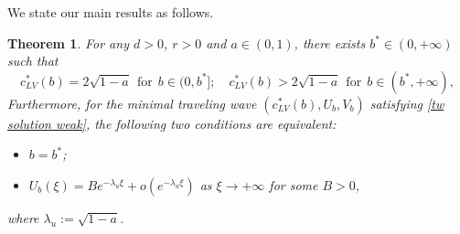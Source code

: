 \documentclass[11pt,a4paper]{article}
\newtheorem{theorem}{\textbf{Theorem}}[section]
\numberwithin{equation}{section}
\numberwithin{figure}{section}
\newcommand{\red}[1]{{\color{red}#1}}
\begin{document}


We state our main results as follows.

\begin{theorem}\label{th:threshold}
For any $d>0$, $r>0$ and $a\in(0,1)$, there exists $b^*\in(0,+\infty)$
such that
\begin{equation*}
c^{*}_{LV}(b)=2\sqrt{1-a}\ \ \mbox{for}\ \ b\in(0,b^*];\quad c^{*}_{LV}(b)>2\sqrt{1-a} \ \ \mbox{for}\ \  b\in(b^*,+\infty),
\end{equation*}
Furthermore,
for the minimal traveling wave $(c^{*}_{LV}(b),U_b,V_b)$ %
satisfying \eqref{tw solution weak},
the following two conditions are equivalent:
\begin{itemize}
\item[(i)] $b=b^*$;
\item[(ii)] $U_b(\xi)=Be^{-\lambda_u\xi}+o(e^{-\lambda_u\xi})$ as $\xi\to+\infty$ for some $B>0$,
\end{itemize}
where $\lambda_u:=\sqrt{1-a}$.
\end{theorem}
\end{document}
